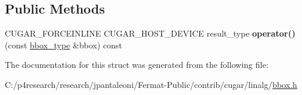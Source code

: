 \subsection*{Public Methods}
\begin{DoxyCompactItemize}
\item 
\mbox{\label{structcugar_1_1bbox__area__functor_a0543b9916c80f68a63fa91d84754528e}} 
C\+U\+G\+A\+R\+\_\+\+F\+O\+R\+C\+E\+I\+N\+L\+I\+NE C\+U\+G\+A\+R\+\_\+\+H\+O\+S\+T\+\_\+\+D\+E\+V\+I\+CE result\+\_\+type {\bfseries operator()} (const \hyperlink{structcugar_1_1_bbox}{bbox\+\_\+type} \&bbox) const
\end{DoxyCompactItemize}


The documentation for this struct was generated from the following file\+:\begin{DoxyCompactItemize}
\item 
C\+:/p4research/research/jpantaleoni/\+Fermat-\/\+Public/contrib/cugar/linalg/\hyperlink{bbox_8h}{bbox.\+h}\end{DoxyCompactItemize}
